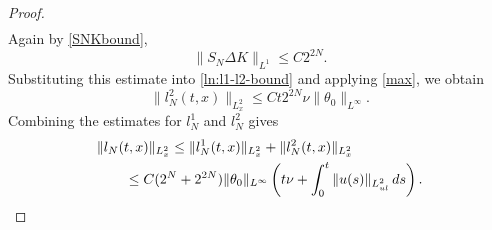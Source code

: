 \documentclass[11pt,reqno,xcolor=svgnames]{amsart}
\theoremstyle{plain}
\theoremstyle{definition}
\theoremstyle{plain}
\theoremstyle{remark}
\begin{document}
\begin{proof}
\begin{equation}
\begin{split}
\end{split}
\end{equation}
Again by \cref{SNKbound},
\begin{equation*}
    \|S_N \Delta K\|_{L^1} \leq C2^{2N}.
\end{equation*}
Substituting this estimate into \eqref{ln:l1-l2-bound} and applying \cref{max}, we obtain
\begin{equation} \label{ln:bound-on-low-freq-no-deriv}
\|l_N^2(t, x) \|_{L^2_x} \leq Ct2^{2N}\nu \| \theta_0 \|_{L^{\infty}}.
\end{equation}
Combining the estimates for $l_N^1$ and $l_N^2$ gives
\begin{equation*}
\begin{split}
&\| l_N(t,x) \|_{L^2_x} \leq \|l_N^1 (t,x) \|_{L^2_x} + \|l_N^2 (t,x) \|_{L^2_x}\\
&\qquad  \leq C(2^{N}+ 2^{2N})\| \theta_0 \|_{L^{\infty}}\left(t\nu + \int_0^t \| u(s) \|_{L^2_{ul}}\, ds \right).
\qedhere
\end{split}
\end{equation*}
\end{proof}
\end{document}
